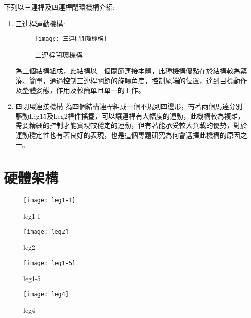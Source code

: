 下列以三連桿及四連桿閉環機構介紹:\\
\begin{enumerate}
\item 三連桿運動機構:

\begin{figure}[hbt!]
\begin{center}
\texttt{[image: 三連桿閉環機構]}
\caption{\Large 三連桿閉環機構}\label{三連桿閉環機構}
\end{center}
\end{figure}

為三個結構組成，此結構以一個關節連接本體，此種機構優點在於結構較為緊湊、簡單，通過控制三連桿關節的旋轉角度，控制尾端的位置，達到目標動作及整體姿態，作用及較簡單且單一的工作。\\
\item 四閉環連接機構
為四個結構連桿組成一個不規則四邊形，有著兩個馬達分別驅動Leg15及Leg2桿件搖擺，可以讓連桿有大幅度的運動，此機構較為複雜，需要精細的控制才能實現較穩定的運動，但有著能承受較大負載的優勢，對於運動穩定性也有著良好的表現，也是這個專題研究為何會選擇此機構的原因之一。
\end{enumerate}
\newpage

\section{硬體架構}
\begin{figure}[htbp]
  \begin{minipage}[t]{0.45\linewidth}
    \centering
    \texttt{[image: leg1-1]}
    \caption{leg1-1}
    \label{leg1-1}
  \end{minipage}
  \hfill
  \begin{minipage}[t]{0.45\linewidth}
    \centering
    \texttt{[image: leg2]}
    \caption{leg2}
    \label{leg2}
  \end{minipage}
\end{figure}

\begin{figure}[htbp]
  \begin{minipage}[t]{0.45\linewidth}
    \centering
    \texttt{[image: leg1-5]}
    \caption{leg1-5}
    \label{leg1-5}
  \end{minipage}
  \hfill
  \begin{minipage}[t]{0.45\linewidth}
    \centering
    \texttt{[image: leg4]}
    \caption{leg4}
    \label{leg4}
  \end{minipage}
\end{figure}
\newpage

